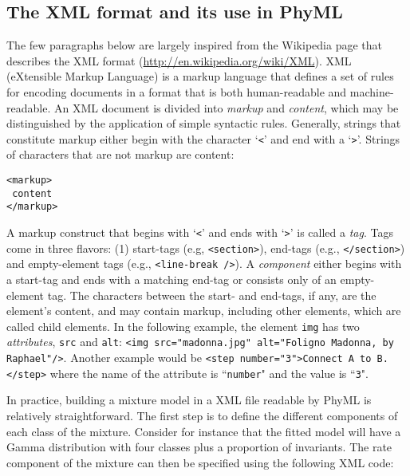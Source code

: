 \documentclass[a4paper,12pt]{article}
\newcommand{\x}[1]{\texttt{#1}}
\begin{document}
\subsection{The XML format and its use in PhyML}\label{sec:XML format}

The few paragraphs below are largely inspired from  the Wikipedia page that describes the XML format
(\url{http://en.wikipedia.org/wiki/XML}). XML (eXtensible Markup Language) is a markup language that
defines  a set  of  rules  for encoding  documents  in  a format  that  is  both human-readable  and
machine-readable.  An  XML document is  divided into  {\em markup} and  {\em content}, which  may be
distinguished  by the  application of  simple syntactic  rules. Generally,  strings that  constitute
markup either begin  with the character `\x{<}' and  end with a `\x{>}'. Strings  of characters that
are not markup are content:

\vspace{0.2cm}
\begin{Verbatim}[frame=single, label=XML markup and content example, samepage=true, baselinestretch=0.5]
<markup> 
 content 
</markup>
\end{Verbatim}

A markup construct that begins  with `\x{<}' and ends with `\x{>}' is called  a {\em tag}. Tags come
in  three  flavors:  (1)  start-tags  (e.g,  \x{<section>}),  end-tags  (e.g.,  \x{</section>})  and
empty-element tags (e.g., \x{<line-break />}). A {\em  component} either begins with a start-tag and
ends with a  matching end-tag or consists only  of an empty-element tag. The  characters between the
start- and  end-tags, if any,  are the  element's content, and  may contain markup,  including other
elements, which are  called child elements.  In  the following example, the element  \x{img} has two
{\em  attributes},  \x{src}   and  \x{alt}:  \x{<img  src="madonna.jpg"   alt="Foligno  Madonna,  by
Raphael"/>}. Another example would be \x{<step number="3">Connect  A to B.</step>} where the name of
the attribute is ``\x{number}" and the value is ``\x{3}".

In  practice,  building   a  mixture  model  in   a  XML  file  readable  by   PhyML  is  relatively
straightforward.  The first  step  is  to define  the  different components  of  each  class of  the
mixture.  Consider for  instance that  the fitted  model will  have a  Gamma distribution  with four
classes plus  a proportion of invariants.  The rate component of  the mixture can then  be specified
using the following XML code:
\end{document}
